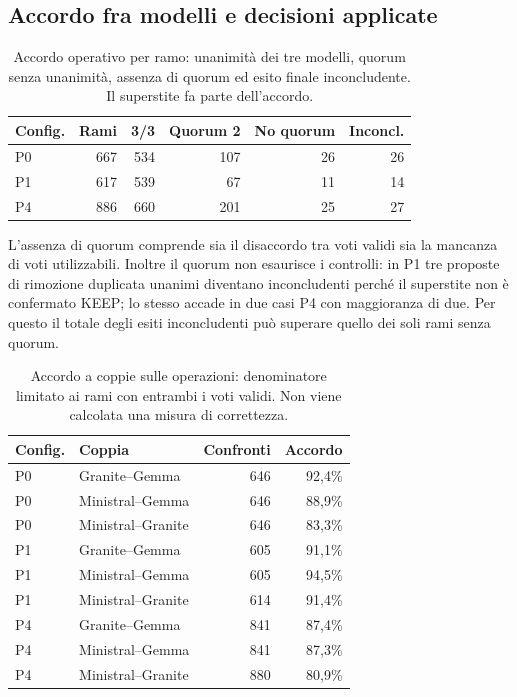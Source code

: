 \subsection{Accordo fra modelli e decisioni applicate}
\begin{table}[!htbp]
\centering\small
\caption{Accordo operativo per ramo: unanimit\`a dei tre modelli, quorum senza unanimit\`a, assenza di quorum ed esito finale inconcludente. Il superstite fa parte dell'accordo.}\label{tab:quorum-dynamics}
\begin{tabular}{lrrrrr}
\toprule
Config. & Rami & 3/3 & Quorum 2 & No quorum & Inconcl. \\
\midrule
P0 & 667 & 534 & 107 & 26 & 26 \\
P1 & 617 & 539 & 67 & 11 & 14 \\
P4 & 886 & 660 & 201 & 25 & 27 \\
\bottomrule
\end{tabular}
\end{table}
L'assenza di quorum comprende sia il disaccordo tra voti validi sia
la mancanza di voti utilizzabili. Inoltre il quorum non esaurisce i
controlli: in P1 tre proposte di rimozione duplicata unanimi diventano
inconcludenti perch\'e il superstite non \`e confermato KEEP; lo stesso
accade in due casi P4 con maggioranza di due. Per questo il totale
degli esiti inconcludenti pu\`o superare quello dei soli rami senza quorum.
\begin{table}[!htbp]
\centering\small
\caption{Accordo a coppie sulle operazioni: denominatore limitato ai rami con entrambi i voti validi. Non viene calcolata una misura di correttezza.}\label{tab:pair-agreement-dynamics}
\begin{tabular}{llrr}
\toprule
Config. & Coppia & Confronti & Accordo \\
\midrule
P0 & Granite--Gemma & 646 & 92,4\% \\
P0 & Ministral--Gemma & 646 & 88,9\% \\
P0 & Ministral--Granite & 646 & 83,3\% \\
P1 & Granite--Gemma & 605 & 91,1\% \\
P1 & Ministral--Gemma & 605 & 94,5\% \\
P1 & Ministral--Granite & 614 & 91,4\% \\
P4 & Granite--Gemma & 841 & 87,4\% \\
P4 & Ministral--Gemma & 841 & 87,3\% \\
P4 & Ministral--Granite & 880 & 80,9\% \\
\bottomrule
\end{tabular}
\end{table}
